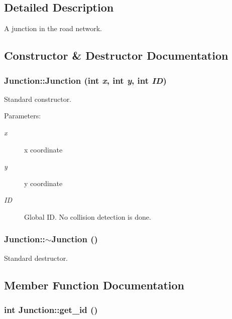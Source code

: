 \subsection{Detailed Description}
A junction in the road network. 



\subsection{Constructor \& Destructor Documentation}
\subsubsection{\setlength{\rightskip}{0pt plus 5cm}Junction::Junction (int {\em x}, int {\em y}, int {\em ID})}\label{classJunction_Junctiona0}


Standard constructor. 

\begin{Desc}
\item[Parameters:]
\begin{description}
\item[{\em x}]x coordinate \item[{\em y}]y coordinate \item[{\em ID}]Global ID. No collision detection is done.\end{description}
\end{Desc}
\subsubsection{\setlength{\rightskip}{0pt plus 5cm}Junction::$\sim${\bf Junction} ()}\label{classJunction_Junctiona1}


Standard destructor. 



\subsection{Member Function Documentation}
\subsubsection{\setlength{\rightskip}{0pt plus 5cm}int Junction::get\_\-id ()\hspace{0.3cm}{\tt  [inline]}}\label{classJunction_Junctiona5}



